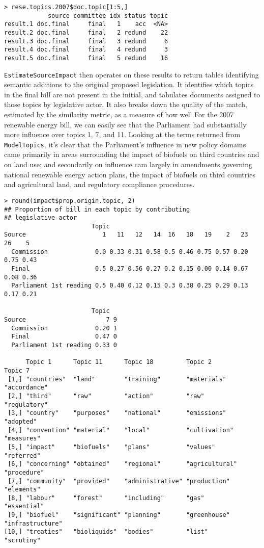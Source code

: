 \documentclass[11pt]{article}
\begin{document}
\begin{verbatim}
> rese.topics.2007$doc.topic[1:5,]
            source committee idx status topic
result.1 doc.final     final   1    acc  <NA>
result.2 doc.final     final   2 redund    22
result.3 doc.final     final   3 redund     6
result.4 doc.final     final   4 redund     3
result.5 doc.final     final   5 redund    16
\end{verbatim}

\texttt{EstimateSourceImpact} then operates on these results to return
tables identifying semantic additions to the original proposed
legislation. It identifies which topics in the final bill are not
present in the initial, and tabulates documents assigned to those
topics by legislative actor. It also breaks down the quality of the
match, estimated by the similarity metric, as a measure of how well
For the 2007 renewable energy bill, we can easily see that the
Parliament had substantially more influence over topics 1, 7, and
11. Looking at the terms returned from \texttt{ModelTopics}, it's
clear that the Parliament's influence in new policy domains came
primarily in areas surrounding the impact of biofuels on third
countries and on land use; and secondarily on  influence cam largely in amendments
governing national renewable energy action plans, the impact of
biofuels on third countries and agricultural land, and regulatory
compliance procedures. 

\begin{verbatim}
> round(impact$prop.origin.topic, 2)
## Proportion of bill in each topic by contributing 
## legislative actor
                        Topic
Source                     1   11   12   14  16   18   19    2   23   26    5
  Commission             0.0 0.33 0.31 0.58 0.5 0.46 0.75 0.57 0.20 0.75 0.43
  Final                  0.5 0.27 0.56 0.27 0.2 0.15 0.00 0.14 0.67 0.08 0.36
  Parliament 1st reading 0.5 0.40 0.12 0.15 0.3 0.38 0.25 0.29 0.13 0.17 0.21

                        Topic
Source                      7 9
  Commission             0.20 1
  Final                  0.47 0
  Parliament 1st reading 0.33 0

      Topic 1      Topic 11      Topic 18         Topic 2         Topic 7          
 [1,] "countries"  "land"        "training"       "materials"     "accordance"     
 [2,] "third"      "raw"         "action"         "raw"           "regulatory"     
 [3,] "country"    "purposes"    "national"       "emissions"     "adopted"        
 [4,] "convention" "material"    "local"          "cultivation"   "measures"       
 [5,] "impact"     "biofuels"    "plans"          "values"        "referred"       
 [6,] "concerning" "obtained"    "regional"       "agricultural"  "procedure"      
 [7,] "community"  "provided"    "administrative" "production"    "elements"       
 [8,] "labour"     "forest"      "including"      "gas"           "essential"      
 [9,] "biofuel"    "significant" "planning"       "greenhouse"    "infrastructure" 
[10,] "treaties"   "bioliquids"  "bodies"         "list"          "scrutiny"       
\end{verbatim}
\end{document}
